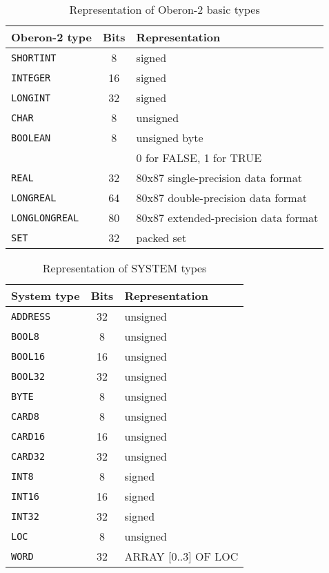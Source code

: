 \begin{table}
\begin{tabular}{|l|c|l|} \hline
\bf Oberon-2 type  & \bf Bits &\bf Representation \\ \hline
\tt SHORTINT       & 8        & signed \\
\tt INTEGER        & 16       & signed \\
\tt LONGINT        & 32       & signed \\
\tt CHAR           & 8        & unsigned \\
\tt BOOLEAN        & 8        & unsigned byte \\
                   &          & 0 for FALSE, 1 for TRUE \\
\tt REAL           & 32       & 80x87 single-precision data format \\
\tt LONGREAL       & 64       & 80x87 double-precision data format \\
\tt LONGLONGREAL   & 80       & 80x87 extended-precision data format \\
\tt SET            & 32       & packed set \\
\hline
\end{tabular}
\caption{Representation of Oberon-2 basic types}\label{table:o2:rep}
\end{table}

\begin{table}
\begin{tabular}{|l|c|l|} \hline
\bf System type  & \bf Bits  &\bf Representation \\ \hline
\tt ADDRESS      & 32    & unsigned   \\
\tt BOOL8        & 8     & unsigned \\
\tt BOOL16       & 16     & unsigned \\
\tt BOOL32       & 32    & unsigned \\
\tt BYTE         & 8     & unsigned  \\
\tt CARD8        & 8     & unsigned \\
\tt CARD16       & 16    & unsigned \\
\tt CARD32       & 32    & unsigned \\
\tt INT8         & 8     & signed \\
\tt INT16        & 16    & signed \\
\tt INT32        & 32    & signed \\
\tt LOC          & 8     & unsigned  \\
\tt WORD         & 32    & ARRAY [0..3] OF LOC  \\
\hline
\end{tabular}
\caption{Representation of SYSTEM types}\label{table:system:rep}
\end{table}

